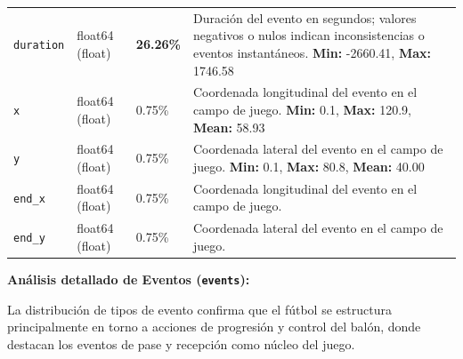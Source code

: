 \documentclass[12pt,a4paper]{article}
\begin{document}
\begin{center}
\begin{longtable}{T{4.3cm} C{2.5cm} C{0.8cm} p{7.0cm}}
\texttt{duration} & float64 \newline (float) & \textcolor{rednull}{\textbf{26.26\%}} & Duración del evento en segundos; valores negativos o nulos indican inconsistencias o eventos instantáneos. \newline \textbf{Min:} -2660.41, \textbf{Max:} 1746.58 \\

\texttt{x} & float64 \newline (float) & \textcolor{orangenull}{0.75\%} & Coordenada longitudinal del evento en el campo de juego. \newline \textbf{Min:} 0.1, \textbf{Max:} 120.9, \textbf{Mean:} 58.93 \\

\texttt{y} & float64 \newline (float) & \textcolor{orangenull}{0.75\%} & Coordenada lateral del evento en el campo de juego. \newline \textbf{Min:} 0.1, \textbf{Max:} 80.8, \textbf{Mean:} 40.00 \\

\texttt{end\_x} & float64 \newline (float) & \textcolor{orangenull}{0.75\%} & Coordenada longitudinal del evento en el campo de juego. \newline \\

\texttt{end\_y} & float64 \newline (float) & \textcolor{orangenull}{0.75\%} & Coordenada lateral del evento en el campo de juego. \newline \\
\bottomrule
\end{longtable}
\end{center}

\textbf{Análisis detallado de Eventos (\texttt{events}):}

La distribución de tipos de evento confirma que el fútbol se estructura principalmente en torno a acciones de progresión y control del balón, donde destacan los eventos de pase y recepción como núcleo del juego.
\end{document}
